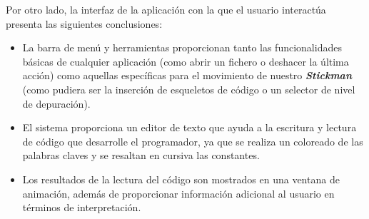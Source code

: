Por otro lado, la interfaz de la aplicación con la que el usuario interactúa presenta las siguientes conclusiones:
\begin{itemize}
   \item La barra de menú y herramientas proporcionan tanto las funcionalidades básicas de cualquier aplicación (como abrir un fichero o 
         deshacer la última acción) como aquellas específicas para el movimiento de nuestro \textbf{\textit{Stickman}} (como pudiera ser
         la inserción de esqueletos de código o un selector de nivel de depuración).
   \item El sistema proporciona un editor de texto que ayuda a la escritura y lectura de código que desarrolle el programador, ya que se realiza
         un coloreado de las palabras claves y se resaltan en cursiva las constantes.
   \item Los resultados de la lectura del código son mostrados en una ventana de animación, además de proporcionar información adicional al
         usuario en términos de interpretación.
\end{itemize}


